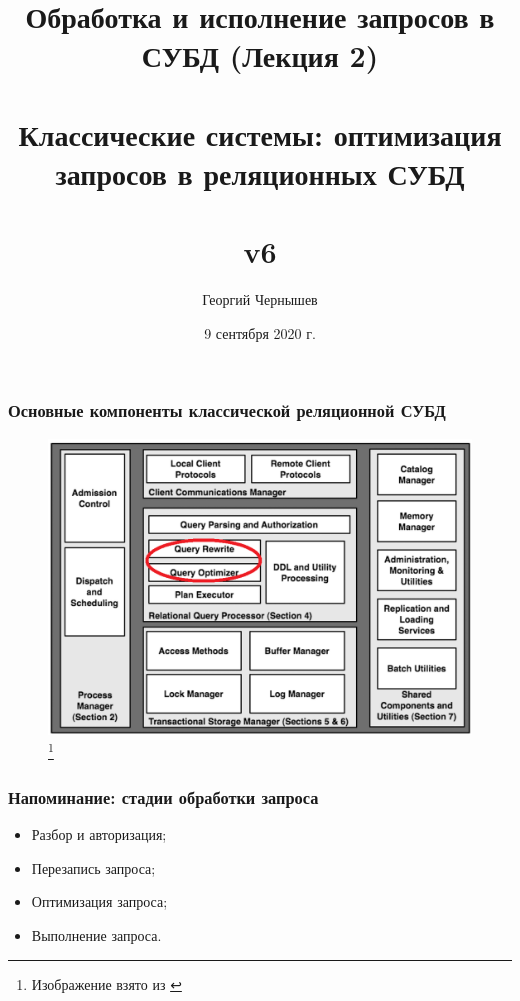 \documentclass{beamer}
\title[Обработка и исполнение запросов: лекция 2]{Обработка и исполнение запросов в СУБД (Лекция 2) \\~\\ Классические системы: оптимизация запросов в реляционных СУБД\\~\\ v6} %
\author{Георгий Чернышев} %
\institute[ВШЭ] %
{
Высшая Школа Экономики \\ %
\medskip
\textit{chernishev@gmail.com} %
}
\date{9 сентября 2020 г.}
\begin{document}
\begin{frame}
\titlepage %
\end{frame}

\begin{frame}
\frametitle{Основные компоненты классической реляционной СУБД}

\begin{figure}[htb]
\includegraphics[width=\textwidth,height=0.75\textheight,keepaspectratio]{overall-schema.png} 
\footnote{\tiny{Изображение взято из \cite{Hellerstein2007}}}
\end{figure}
\end{frame}

\begin{frame}
\frametitle{Напоминание: стадии обработки запроса}
\begin{itemize}
  \setlength\itemsep{1em}
  \item Разбор и авторизация;
  \item Перезапись запроса;
  \item Оптимизация запроса;
  \item Выполнение запроса.
\end{itemize}
\end{frame}
\end{document}
